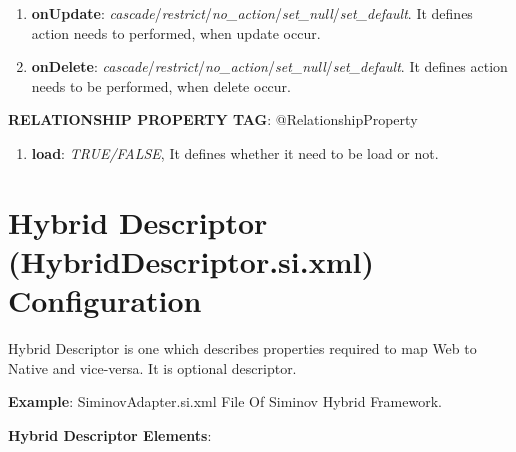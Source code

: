 \begin{enumerate}
\begin{enumerate}
			\item \small \textbf{onUpdate}: \textit{cascade}/\textit{restrict}/\textit{no\_action}/\textit{set\_null}/\textit{set\_default}. It defines action needs to performed, when update occur. 
			\item \small \textbf{onDelete}: \textit{cascade}/\textit{restrict}/\textit{no\_action}/\textit{set\_null}/\textit{set\_default}. It defines action needs to be performed, when delete occur.		

		\end{enumerate}

	\par
		\textbf{RELATIONSHIP PROPERTY TAG}: @RelationshipProperty

			\begin{enumerate}

				\item \small \textbf{load}: \textit{TRUE/FALSE}, It defines whether it need to be load or not.	

			\end{enumerate}


\end{enumerate}





\newpage
\section{Hybrid Descriptor (HybridDescriptor.si.xml) Configuration} 
	Hybrid Descriptor is one which describes properties required to map Web to Native and vice-versa. It is optional descriptor.




\textbf{Example}: SiminovAdapter.si.xml File Of Siminov Hybrid Framework.




\textbf{Hybrid Descriptor Elements}: 

